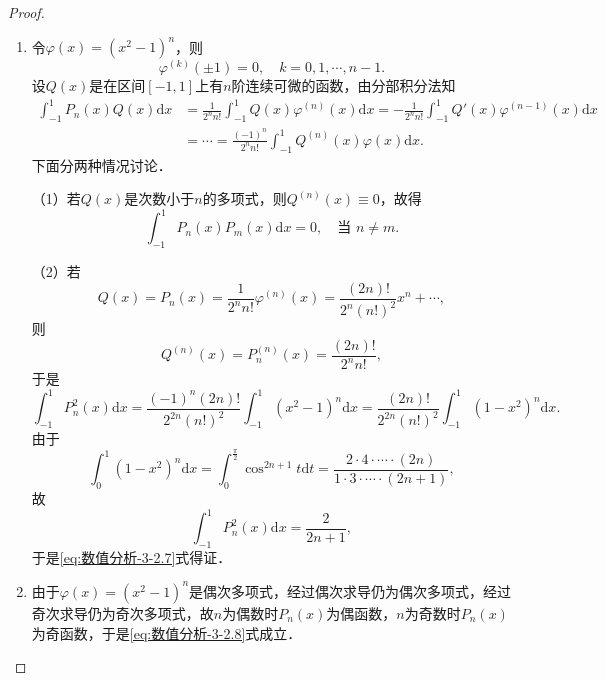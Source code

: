 \documentclass[../../main.tex]{subfiles}%
\begin{document}
\begin{proof}
\begin{enumerate}
\item 令$\varphi(x) = (x^2 - 1)^n$，则
$$\varphi^{(k)}(\pm 1) = 0,\quad k = 0,1,\cdots,n-1.$$
设$Q(x)$是在区间$[-1,1]$上有$n$阶连续可微的函数，由分部积分法知
\begin{align*}
\int_{-1}^1 P_n(x)Q(x)\mathrm{d}x &= \frac{1}{2^n n!}\int_{-1}^1 Q(x)\varphi^{(n)}(x)\mathrm{d}x = -\frac{1}{2^n n!}\int_{-1}^1 Q'(x)\varphi^{(n-1)}(x)\mathrm{d}x \\
&= \cdots = \frac{(-1)^n}{2^n n!}\int_{-1}^1 Q^{(n)}(x)\varphi(x)\mathrm{d}x.
\end{align*}
下面分两种情况讨论．

（1）若$Q(x)$是次数小于$n$的多项式，则$Q^{(n)}(x) \equiv 0$，故得
$$\int_{-1}^1 P_n(x)P_m(x)\mathrm{d}x = 0,\quad \text{当 } n \neq m.$$

（2）若
$$Q(x) = P_n(x) = \frac{1}{2^n n!}\varphi^{(n)}(x) = \frac{(2n)!}{2^n (n!)^2}x^n + \cdots,$$
则
$$Q^{(n)}(x) = P_n^{(n)}(x) = \frac{(2n)!}{2^n n!},$$
于是
$$\int_{-1}^1 P_n^2(x)\mathrm{d}x = \frac{(-1)^n (2n)!}{2^{2n} (n!)^2}\int_{-1}^1 (x^2 - 1)^n \mathrm{d}x = \frac{(2n)!}{2^{2n} (n!)^2}\int_{-1}^1 (1 - x^2)^n \mathrm{d}x.$$
由于
$$\int_{0}^1 (1 - x^2)^n \mathrm{d}x = \int_{0}^{\frac{\pi}{2}} \cos^{2n+1}t \mathrm{d}t = \frac{2 \cdot 4 \cdot \cdots \cdot (2n)}{1 \cdot 3 \cdot \cdots \cdot (2n+1)},$$
故
$$\int_{-1}^1 P_n^2(x)\mathrm{d}x = \frac{2}{2n+1},$$
于是\eqref{eq:数值分析-3-2.7}式得证．

\item 由于$\varphi(x) = (x^2 - 1)^n$是偶次多项式，经过偶次求导仍为偶次多项式，经过奇次求导仍为奇次多项式，故$n$为偶数时$P_n(x)$为偶函数，$n$为奇数时$P_n(x)$为奇函数，于是\eqref{eq:数值分析-3-2.8}式成立．


\end{enumerate}
\end{proof}
\end{document}
